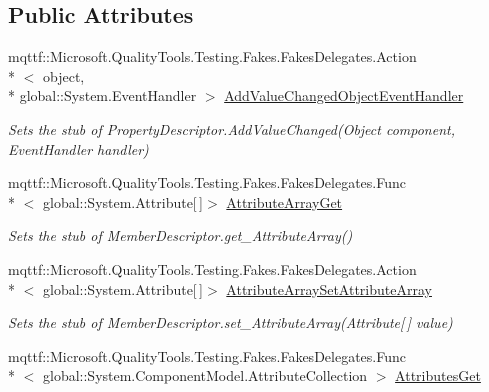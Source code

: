 \subsection*{Public Attributes}
\begin{DoxyCompactItemize}
\item 
mqttf\-::\-Microsoft.\-Quality\-Tools.\-Testing.\-Fakes.\-Fakes\-Delegates.\-Action\\*
$<$ object, \\*
global\-::\-System.\-Event\-Handler $>$ \hyperlink{class_system_1_1_component_model_1_1_fakes_1_1_stub_property_descriptor_a12121b52dff80481e7d8431d94947842}{Add\-Value\-Changed\-Object\-Event\-Handler}
\begin{DoxyCompactList}\small\item\em Sets the stub of Property\-Descriptor.\-Add\-Value\-Changed(\-Object component, Event\-Handler handler)\end{DoxyCompactList}\item 
mqttf\-::\-Microsoft.\-Quality\-Tools.\-Testing.\-Fakes.\-Fakes\-Delegates.\-Func\\*
$<$ global\-::\-System.\-Attribute\mbox{[}$\,$\mbox{]}$>$ \hyperlink{class_system_1_1_component_model_1_1_fakes_1_1_stub_property_descriptor_acf26986bc6e5c8de692e4f3e044cc0cf}{Attribute\-Array\-Get}
\begin{DoxyCompactList}\small\item\em Sets the stub of Member\-Descriptor.\-get\-\_\-\-Attribute\-Array()\end{DoxyCompactList}\item 
mqttf\-::\-Microsoft.\-Quality\-Tools.\-Testing.\-Fakes.\-Fakes\-Delegates.\-Action\\*
$<$ global\-::\-System.\-Attribute\mbox{[}$\,$\mbox{]}$>$ \hyperlink{class_system_1_1_component_model_1_1_fakes_1_1_stub_property_descriptor_ac74288cc2567f02e424bef175602622c}{Attribute\-Array\-Set\-Attribute\-Array}
\begin{DoxyCompactList}\small\item\em Sets the stub of Member\-Descriptor.\-set\-\_\-\-Attribute\-Array(\-Attribute\mbox{[}$\,$\mbox{]} value)\end{DoxyCompactList}\item 
mqttf\-::\-Microsoft.\-Quality\-Tools.\-Testing.\-Fakes.\-Fakes\-Delegates.\-Func\\*
$<$ global\-::\-System.\-Component\-Model.\-Attribute\-Collection $>$ \hyperlink{class_system_1_1_component_model_1_1_fakes_1_1_stub_property_descriptor_a8dfef55ee32a13c8420eb5f97480d707}{Attributes\-Get}

\end{DoxyCompactItemize}
